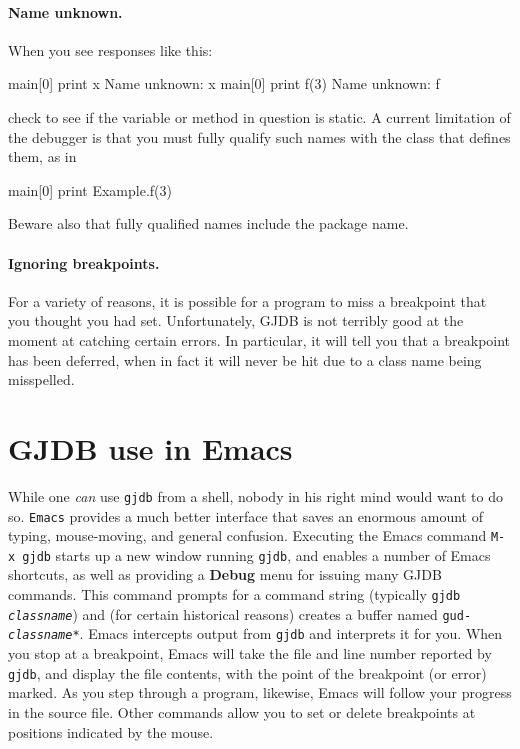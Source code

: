 \documentclass[11pt,twoside]{handout}
\begin{document}
\paragraph{Name unknown.} When you see responses like this:
\begin{program}
main[0] print x
Name unknown: x
main[0] print f(3)
Name unknown: f
\end{program}
check to see if the variable or method in question is static.  A
current limitation of the debugger is that you must fully qualify such
names with the class that defines them, as in 
\begin{program}
main[0] print Example.f(3)
\end{program}
Beware also that fully qualified names include the package name.

\paragraph{Ignoring breakpoints.} For a variety of reasons, it is
possible for a program to miss a breakpoint that you thought you had
set.  Unfortunately, GJDB is not terribly good at the moment at
catching certain errors. In particular, it will tell you that a breakpoint has been deferred, when in
fact it will never be hit due to a class name being misspelled.

\section{GJDB use in Emacs}\label{sec:emacs}
While one {\it can\/} use {\tt gjdb} from a shell, nobody in his right
mind would want to do so.  {\tt Emacs} provides a much better
interface that saves an enormous amount of typing, mouse-moving, and
general confusion.  Executing the Emacs command {\tt M-x~gjdb} starts
up a new window  running {\tt gjdb}, and enables a number of Emacs
shortcuts, as well as providing a {\bf Debug} menu for issuing many 
GJDB commands.    This command prompts for a command string (typically
{\tt gjdb {\it classname\/}}) and (for certain historical reasons)
creates a buffer 
named {\tt *gud-{\it classname\/}*}.
Emacs intercepts 
output from {\tt gjdb} and interprets it for you.  When you stop at a
breakpoint, Emacs will take the file and line number reported by {\tt
gjdb}, and display the file contents, with the point of the breakpoint
(or error) marked.  As you step through a program, likewise, Emacs will
follow your progress in the source file.  Other commands allow you to
set or delete breakpoints at positions indicated by the mouse.  
\end{document}
